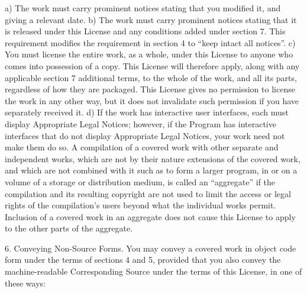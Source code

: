 a) The work must carry prominent notices stating that you modified it, and giving a relevant date.
b) The work must carry prominent notices stating that it is released under this License and any conditions added under section 7. This requirement modifies the requirement in section 4 to “keep intact all notices”.
c) You must license the entire work, as a whole, under this License to anyone who comes into possession of a copy. This License will therefore apply, along with any applicable section 7 additional terms, to the whole of the work, and all its parts, regardless of how they are packaged. This License gives no permission to license the work in any other way, but it does not invalidate such permission if you have separately received it.
d) If the work has interactive user interfaces, each must display Appropriate Legal Notices; however, if the Program has interactive interfaces that do not display Appropriate Legal Notices, your work need not make them do so.
A compilation of a covered work with other separate and independent works, which are not by their nature extensions of the covered work, and which are not combined with it such as to form a larger program, in or on a volume of a storage or distribution medium, is called an “aggregate” if the compilation and its resulting copyright are not used to limit the access or legal rights of the compilation's users beyond what the individual works permit. Inclusion of a covered work in an aggregate does not cause this License to apply to the other parts of the aggregate.

6. Conveying Non-Source Forms.
You may convey a covered work in object code form under the terms of sections 4 and 5, provided that you also convey the machine-readable Corresponding Source under the terms of this License, in one of these ways:

